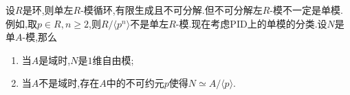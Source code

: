 \begin{remark}{}{}
	设$R$是环,则单左$R$-模循环,有限生成且不可分解.但不可分解左$R$-模不一定是单模.例如,取$p\in R,n\geq 2$,则$R/\langle p^{n}\rangle$不是单左$R$-模.现在考虑PID上的单模的分类.设$N$是单$A$-模,那么
	\begin{enumerate}
		\item 当$A$是域时,$N$是$1$维自由模;
		\item 当$A$不是域时,存在$A$中的不可约元$p$使得$N\simeq A/\langle p\rangle$.
	\end{enumerate}
\end{remark}























